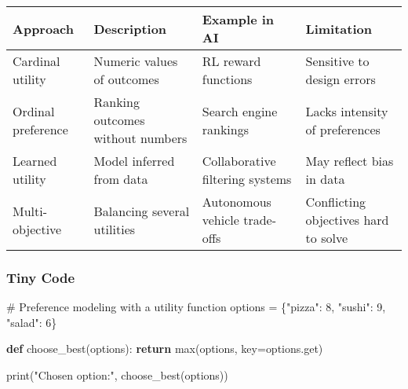 \documentclass[
  letterpaper,
  DIV=11,
  numbers=noendperiod]{scrreprt}
\newenvironment{Shaded}{\begin{snugshade}}{\end{snugshade}}
\newcommand{\BuiltInTok}[1]{\textcolor[rgb]{0.00,0.23,0.31}{#1}}
\newcommand{\CommentTok}[1]{\textcolor[rgb]{0.37,0.37,0.37}{#1}}
\newcommand{\ControlFlowTok}[1]{\textcolor[rgb]{0.00,0.23,0.31}{\textbf{#1}}}
\newcommand{\DecValTok}[1]{\textcolor[rgb]{0.68,0.00,0.00}{#1}}
\newcommand{\KeywordTok}[1]{\textcolor[rgb]{0.00,0.23,0.31}{\textbf{#1}}}
\newcommand{\NormalTok}[1]{\textcolor[rgb]{0.00,0.23,0.31}{#1}}
\newcommand{\OperatorTok}[1]{\textcolor[rgb]{0.37,0.37,0.37}{#1}}
\newcommand{\StringTok}[1]{\textcolor[rgb]{0.13,0.47,0.30}{#1}}
\begin{document}
\begin{longtable}[]{@{}
  >{\raggedright\arraybackslash}p{}
  >{\raggedright\arraybackslash}p{}
  >{\raggedright\arraybackslash}p{}
  >{\raggedright\arraybackslash}p{}@{}}
\toprule\noalign{}
\begin{minipage}[b]{\linewidth}\raggedright
Approach
\end{minipage} & \begin{minipage}[b]{\linewidth}\raggedright
Description
\end{minipage} & \begin{minipage}[b]{\linewidth}\raggedright
Example in AI
\end{minipage} & \begin{minipage}[b]{\linewidth}\raggedright
Limitation
\end{minipage} \\
\midrule\noalign{}
\endhead
\bottomrule\noalign{}
\endlastfoot
Cardinal utility & Numeric values of outcomes & RL reward functions &
Sensitive to design errors \\
Ordinal preference & Ranking outcomes without numbers & Search engine
rankings & Lacks intensity of preferences \\
Learned utility & Model inferred from data & Collaborative filtering
systems & May reflect bias in data \\
Multi-objective & Balancing several utilities & Autonomous vehicle
trade-offs & Conflicting objectives hard to solve \\
\end{longtable}

\subsubsection{Tiny Code}\label{tiny-code-11}

\begin{Shaded}
\begin{Highlighting}[]
\CommentTok{\# Preference modeling with a utility function}
\NormalTok{options }\OperatorTok{=}\NormalTok{ \{}\StringTok{"pizza"}\NormalTok{: }\DecValTok{8}\NormalTok{, }\StringTok{"sushi"}\NormalTok{: }\DecValTok{9}\NormalTok{, }\StringTok{"salad"}\NormalTok{: }\DecValTok{6}\NormalTok{\}}

\KeywordTok{def}\NormalTok{ choose\_best(options):}
    \ControlFlowTok{return} \BuiltInTok{max}\NormalTok{(options, key}\OperatorTok{=}\NormalTok{options.get)}

\BuiltInTok{print}\NormalTok{(}\StringTok{"Chosen option:"}\NormalTok{, choose\_best(options))}
\end{Highlighting}
\end{Shaded}
\end{document}
